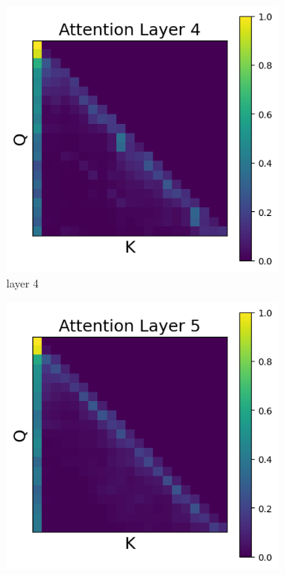 \documentclass[11pt]{article}
\begin{document}
\begin{figure}[t]
  \begin{subfigure}[t]{0.24\textwidth}
    \centering
    \includegraphics[width=1.4\columnwidth]{figures/intervention5/layer_4.png}
    \caption{layer 4}
    \label{fig:intervention5_layer4}
  \end{subfigure}\hfill
  \begin{subfigure}[t]{0.24\textwidth}
    \centering
    \includegraphics[width=1.4\columnwidth]{figures/intervention5/layer_5.png}

\end{subfigure}
\end{figure}
\end{document}
